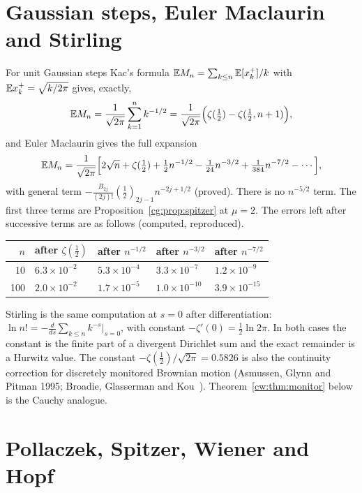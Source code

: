 \section{Gaussian steps, Euler Maclaurin and Stirling}\label{cw:sec:gauss}

For unit Gaussian steps Kac's formula $\mathbb{E} M_n=\sum_{k\le n}\mathbb{E}[x_k^+]/k$ with $\mathbb{E} x_k^+=\sqrt{k/2\pi}$ gives, exactly,
\[
\mathbb{E} M_n=\frac{1}{\sqrt{2\pi}}\sum_{k=1}^nk^{-1/2}=\frac{1}{\sqrt{2\pi}}\Big(\zeta(\tfrac12)-\zeta(\tfrac12,n+1)\Big),
\]
and Euler Maclaurin gives the full expansion
\begin{equation}\label{cw:eq:gauss}
\mathbb{E} M_n=\frac{1}{\sqrt{2\pi}}\Big[2\sqrt n+\zeta(\tfrac12)+\tfrac12n^{-1/2}-\tfrac1{24}n^{-3/2}+\tfrac1{384}n^{-7/2}-\cdots\Big],
\end{equation}
with general term $-\frac{B_{2j}}{(2j)!}(\tfrac12)_{2j-1}n^{-2j+1/2}$ (proved). There is no $n^{-5/2}$ term. The first three terms are Proposition~\ref{cg:prop:spitzer} at $\mu=2$. The errors left after successive terms are as follows (computed, reproduced).
\begin{center}
\small
\begin{tabular}{rllll}
\toprule
$n$ & after $\zeta(\frac12)$ & after $n^{-1/2}$ & after $n^{-3/2}$ & after $n^{-7/2}$\\
\midrule
10 & $6.3\times10^{-2}$ & $5.3\times10^{-4}$ & $3.3\times10^{-7}$ & $1.2\times10^{-9}$\\
100 & $2.0\times10^{-2}$ & $1.7\times10^{-5}$ & $1.0\times10^{-10}$ & $3.9\times10^{-15}$\\
\bottomrule
\end{tabular}
\end{center}
Stirling is the same computation at $s=0$ after differentiation: $\ln n!=-\frac{d}{ds}\sum_{k\le n}k^{-s}\big|_{s=0}$, with constant $-\zeta'(0)=\tfrac12\ln2\pi$. In both cases the constant is the finite part of a divergent Dirichlet sum and the exact remainder is a Hurwitz value. The constant $-\zeta(\tfrac12)/\sqrt{2\pi}=0.5826$ is also the continuity correction for discretely monitored Brownian motion (Asmussen, Glynn and Pitman 1995; Broadie, Glasserman and Kou~\cite{BGK97}). Theorem~\ref{cw:thm:monitor} below is the Cauchy analogue.

\section{Pollaczek, Spitzer, Wiener and Hopf}\label{cw:sec:ps}

